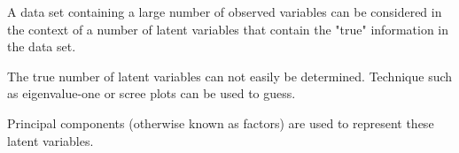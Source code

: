 
A data set containing a large number of observed variables can be considered in the context of a number of latent variables that contain the "true" information in the data set.

The true number of latent variables can not easily be determined. Technique such as eigenvalue-one or scree plots can be used to guess. 

Principal components (otherwise known as factors) are used to represent these latent variables. 


